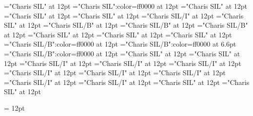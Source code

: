 \documentclass[a4paper]{article}
\begin{document}
\pagestyle{plain}
\sloppy
\setlength{\parfillskip}{0pt plus 1fil}
\font\spanen="Charis SIL" at 12pt
\font\spanur="Charis SIL":color=ff0000 at 12pt
\font\diven="Charis SIL" at 12pt
\font\divur="Charis SIL" at 12pt
\font\xitemxitemdefinitionbefore="Charis SIL" at 12pt
\font\xitemxitemexamplebefore="Charis SIL/I" at 12pt
\font\xitemxitemexamplesbefore="Charis SIL" at 12pt
\font\xitemxitemheadwordbefore="Charis SIL/B" at 12pt
\font\xitemxitemheadwordminorbefore="Charis SIL/B" at 12pt
\font\xitemxitemLexEntrypublishRootMinorPrimaryTargetHeadWordRefbefore="Charis SIL/B" at 12pt
\font\xitemxitemlexreftargetsbefore="Charis SIL" at 12pt
\font{}="Charis SIL" at 12pt
\font\entryletDatadicBody="Charis SIL" at 12pt
\font\headwordurentryletDatadicBody="Charis SIL/B":color=ff0000 at 12pt
\font\xhomographnumberheadwordurentryletDatadicBody="Charis SIL/B":color=ff0000 at 6.6pt
\font\spanenheadwordurentryletDatadicBody="Charis SIL/B":color=ff0000 at 12pt
\font\sensesentryletDatadicBody="Charis SIL" at 12pt
\font\sensesensesentryletDatadicBody="Charis SIL" at 12pt
\font\grammaticalinfosensesensesentryletDatadicBody="Charis SIL/I" at 12pt
\font\partofspeechengrammaticalinfosensesensesentryletDatadicBody="Charis SIL/I" at 12pt
\font\spanenpartofspeechengrammaticalinfosensesensesentryletDatadicBody="Charis SIL/I" at 12pt
\font\slotsgrammaticalinfosensesensesentryletDatadicBody="Charis SIL/I" at 12pt
\font\spanenslotsgrammaticalinfosensesensesentryletDatadicBody="Charis SIL/I" at 12pt
\font\slotnameenslotsgrammaticalinfosensesensesentryletDatadicBody="Charis SIL/I" at 12pt
\font\spanenslotnameenslotsgrammaticalinfosensesensesentryletDatadicBody="Charis SIL/I" at 12pt
\font\spanengrammaticalinfosensesensesentryletDatadicBody="Charis SIL/I" at 12pt
\font{}="Charis SIL" at 12pt
\font\spanendefinitionensensesensesentryletDatadicBody="Charis SIL" at 12pt

\pagestyle{fancy} 
\setlength{\columnsep}{1.5em} 
\setlength\columnseprule{0.4pt} 
\begin{multicols}{2}{\raggedleft} \begin{spacing}{1.5}
\hangindent= 12pt
  \spanenslotsgrammaticalinfosensesensesentryletDatadicBody{: }  \end{spacing}
 \end{multicols}
\end{document}
